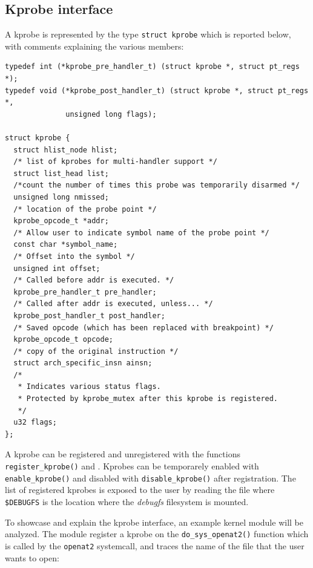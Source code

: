 

\subsection{Kprobe interface}

A kprobe is represented by the type \verb|struct kprobe| which is reported
below, with comments explaining the various members:

\begin{verbatim}
typedef int (*kprobe_pre_handler_t) (struct kprobe *, struct pt_regs *);
typedef void (*kprobe_post_handler_t) (struct kprobe *, struct pt_regs *,
              unsigned long flags);

struct kprobe {
  struct hlist_node hlist;
  /* list of kprobes for multi-handler support */
  struct list_head list;
  /*count the number of times this probe was temporarily disarmed */
  unsigned long nmissed;
  /* location of the probe point */
  kprobe_opcode_t *addr;
  /* Allow user to indicate symbol name of the probe point */
  const char *symbol_name;
  /* Offset into the symbol */
  unsigned int offset;
  /* Called before addr is executed. */
  kprobe_pre_handler_t pre_handler;
  /* Called after addr is executed, unless... */
  kprobe_post_handler_t post_handler;
  /* Saved opcode (which has been replaced with breakpoint) */
  kprobe_opcode_t opcode;
  /* copy of the original instruction */
  struct arch_specific_insn ainsn;
  /*
   * Indicates various status flags.
   * Protected by kprobe_mutex after this kprobe is registered.
   */
  u32 flags;
};
\end{verbatim}

A kprobe can be registered and unregistered with the functions
\verb|register_kprobe()| and . Kprobes can be
temporarely enabled with \verb|enable_kprobe()| and disabled with
\verb|disable_kprobe()| after registration. The list of registered kprobes is
exposed to the user by reading the file  where
\verb|$DEBUGFS| is the location where the \textit{debugfs} filesystem is
mounted.

To showcase and explain the kprobe interface, an example kernel module will be
analyzed. The module register a kprobe on the \verb|do_sys_openat2()| function
which is called by the \verb|openat2| systemcall, and traces the name of the
file that the user wants to open:

